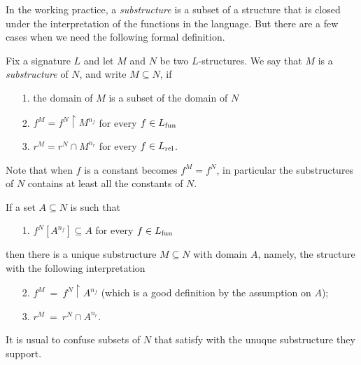 \def\medrel#1{\parbox[t]{6ex}{$\displaystyle\hfil #1$}}
\def\ceq#1#2#3{\parbox{10ex}{$\displaystyle #1$}\medrel{#2}$\displaystyle  #3$}

In the working practice, 
a \textit{substructure\/} is a subset of a structure that is closed under the interpretation of the functions in the language.  
But there are a few cases when we need the following formal definition.

\begin{definition}\label{sottostrutturadef}
Fix a signature $L$ and let $M$ and $N$ be two $L$-structures. We say that $M$ is a \emph{substructure\/} of $N$, and write \emph{$M\subseteq N$}, if
\begin{itemize}
\item[1.] the domain of $M$ is a subset of the domain of $N$
\item[2.] $f^M=f^N\restriction M^{n_f}$ for every $f\in L_{\rm fun}$
\item[3.] $r^M=r^N\cap M^{n_r}$ for every $f\in L_{\rm rel}$.
\end{itemize}
\end{definition}

Note that when $f$ is a constant  becomes $f^M=f^N$, in particular the substructures of $N$ contains at least all the constants of $N$.

If a set $A\subseteq N$ is such that 
\begin{itemize}
\item[1.] $f^N[A^{n_f}]\subseteq A$ for every  $f\in L_{\rm fun}$ 
\end{itemize}
then there is a unique substructure $M\subseteq N$ with domain $A$, namely, the structure with the following interpretation
\begin{itemize}
\item[2.] $f^M\ =\ f^N\restriction A^{n_f}$ (which is a good definition by the assumption on $A$);
\item[3.] $r^M\ =\ r^N\cap A^{n_r}$.
\end{itemize}
It is usual to confuse subsets of $N$ that satisfy  with the unuque substructure they support.

